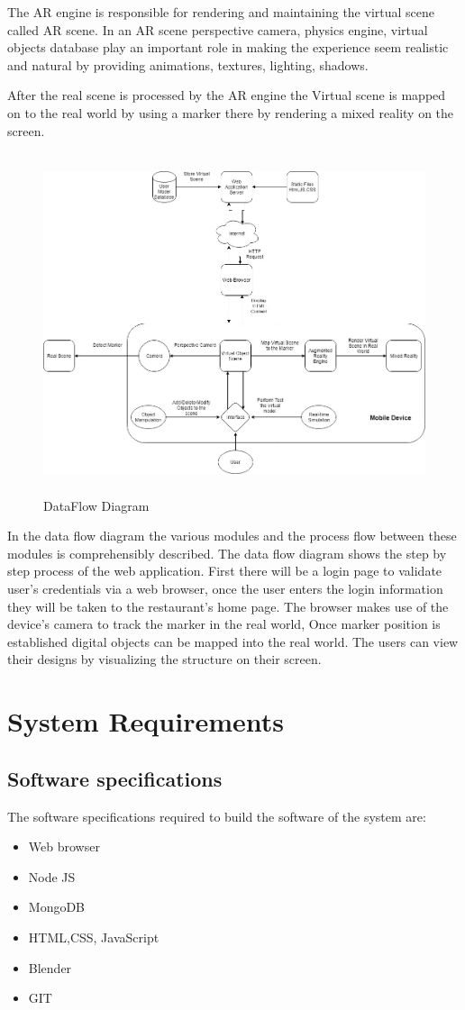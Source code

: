 \documentclass[BTech]{srmuthesis}
\begin{document}
The AR engine is responsible for rendering and maintaining the virtual scene called AR scene. In an AR scene perspective camera, physics engine, virtual objects database play an important role in making the experience seem realistic and natural by providing animations, textures, lighting, shadows.

After the real scene is processed by the AR engine the Virtual scene is mapped on to the real world by using a marker there by rendering a mixed reality on the screen.
\begin{figure}
	\centering
	\includegraphics[width=\linewidth, height=10cm,keepaspectratio]{dataflow}
	\caption{DataFlow Diagram}
	\label{fig:data}
\end{figure}

In the data flow diagram the various modules and the process flow between these modules is comprehensibly described.
The data flow diagram shows the step by step process of the web application. First there will be a login page to validate user's credentials via a web browser, once the user enters the login information they will be taken to the restaurant's home page. The browser makes use of the device's camera to track the marker in the real world, Once marker position is established digital objects can be mapped into the real world.
The users can view their designs by visualizing the structure on their screen.

\section{System Requirements}
\subsection{Software specifications}
The software specifications required to build the software of the system are:
\begin{itemize}
	\item Web browser
	\item Node JS
	\item MongoDB
	\item HTML,CSS, JavaScript
	\item Blender
	\item GIT 
\end{itemize}
\end{document}
